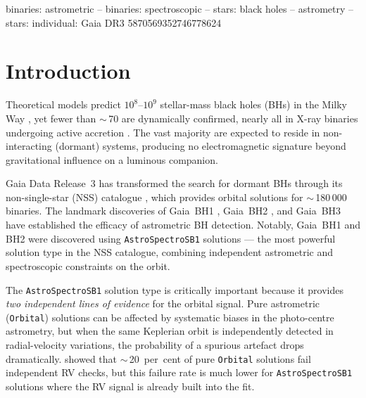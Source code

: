 \documentclass[usenatbib,fleqn]{mnras}
\newcommand{\Msun}{{\rm M}_\odot}
\begin{document}
\begin{keywords}
binaries: astrometric -- binaries: spectroscopic --
stars: black holes -- astrometry --
stars: individual: Gaia DR3 5870569352746778624
\end{keywords}

\section{Introduction}
\label{sec:intro}

Theoretical models predict $10^8$--$10^9$ stellar-mass black holes
(BHs) in the Milky Way \citep{AgolKamionkowski2002, Shapiro1983},
yet fewer than $\sim$\,70 are dynamically confirmed, nearly all in
X-ray binaries undergoing active accretion
\citep{RemillardMcClintock2006}.  The vast majority are expected to
reside in non-interacting (dormant) systems, producing no
electromagnetic signature beyond gravitational influence on a
luminous companion.

Gaia Data Release~3 \citep[DR3;][]{GaiaCollaboration2023} has
transformed the search for dormant BHs through its non-single-star
(NSS) catalogue \citep{GaiaNSS2023}, which provides orbital
solutions for $\sim$\,180\,000 binaries.  The landmark discoveries
of Gaia~BH1
\citep[$M_2 \approx 9.6\,\Msun$;][]{ElBadry2023a}, Gaia~BH2
\citep[$M_2 \approx 8.9\,\Msun$;][]{ElBadry2023b}, and Gaia~BH3
\citep[$M_2 \approx 33\,\Msun$;][]{GaiaBH3_2024} have established
the efficacy of astrometric BH detection.  Notably, Gaia~BH1 and
BH2 were discovered using \texttt{AstroSpectroSB1} solutions ---
the most powerful solution type in the NSS catalogue, combining
independent astrometric and spectroscopic constraints on the orbit.

The \texttt{AstroSpectroSB1} solution type is critically important
because it provides \emph{two independent lines of evidence} for
the orbital signal.  Pure astrometric (\texttt{Orbital}) solutions
can be affected by systematic biases in the photo-centre
astrometry, but when the same Keplerian orbit is independently
detected in radial-velocity variations, the probability of a
spurious artefact drops dramatically.  \citet{ElBadry2024} showed
that $\sim$\,20~per~cent of pure \texttt{Orbital} solutions fail
independent RV checks, but this failure rate is much lower for
\texttt{AstroSpectroSB1} solutions where the RV signal is already
built into the fit.
\end{document}
